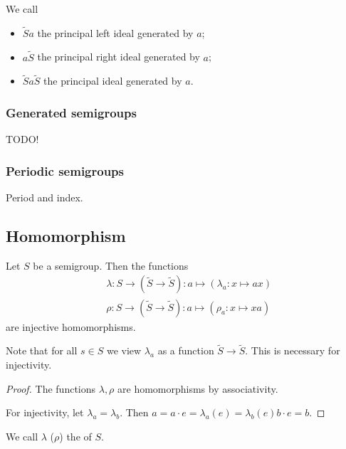 \begin{definition}
We call
\begin{itemize}
\item $\widetilde{S}a$ the principal left ideal generated by $a$; 
\item $a\widetilde{S}$ the principal right ideal generated by $a$; 
\item $\widetilde{S}a\widetilde{S}$ the principal ideal generated by $a$.
\end{itemize}
\end{definition}

\subsubsection{Generated semigroups}
TODO!

\subsubsection{Periodic semigroups}
Period and index.

\subsection{Homomorphism}

\begin{proposition}
Let $S$ be a semigroup. Then the functions
\begin{align*}
&\lambda: S \to (\widetilde{S} \to \widetilde{S}) : a\mapsto (\lambda_a: x\mapsto ax) \\
&\rho: S \to (\widetilde{S} \to \widetilde{S}): a\mapsto (\rho_a: x\mapsto xa)
\end{align*}
are injective homomorphisms.
\end{proposition}
Note that for all $s\in S$ we view $\lambda_a$ as a function $\widetilde{S} \to \widetilde{S}$. This is necessary for injectivity.
\begin{proof}
The functions $\lambda, \rho$ are homomorphisms by associativity.

For injectivity, let $\lambda_a = \lambda_b$. Then $a = a\cdot e = \lambda_a(e) = \lambda_b(e) b\cdot e = b$.
\end{proof}

\begin{definition}
We call $\lambda$ ($\rho$) the  of $S$.
\end{definition}

